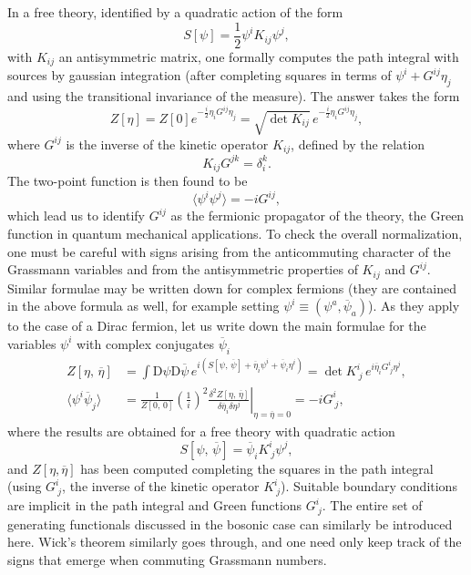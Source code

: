 In a free theory, identified by a quadratic action of the form
\[
    S[\psi] = \frac{1}{2} \psi^i K_{ij} \psi^j,
\]
with \(K_{ij}\) an antisymmetric matrix, one formally computes the path integral with sources by gaussian integration (after completing squares in terms of \(\psi^i + G^{ij} \eta_j \) and using the transitional invariance of the measure). The answer takes the form
\[
    Z[\eta] = Z[0] e^{-\frac{i}{2} \eta_i G^{ij} \eta_j} = \sqrt{\det K_{ij}} \, e^{-\frac{i}{2} \eta_i G^{ij} \eta_j},
\]
where \(G^{ij}\) is the inverse of the kinetic operator \(K_{ij}\), defined by the relation
\[
    K_{ij} G^{jk} = \delta_i^k.
\]
The two-point function is then found to be
\[
    \langle \psi^{i} \psi^{j} \rangle = -i G^{ij},
\]
which lead us to identify \(G^{ij}\) as the fermionic propagator of the theory, the Green function in quantum mechanical applications. To check the overall normalization, one must be careful with signs arising from the anticommuting character of the Grassmann variables and from the antisymmetric properties of \(K_{ij}\) and \(G^{ij}\). Similar formulae may be written down for complex fermions (they are contained in the above formula as well, for example setting \(\psi^i \equiv (\psi^a, \overline{\psi}_a)\)). As they apply to the case of a Dirac fermion, let us write down the main formulae for the variables \(\psi^i\) with complex conjugates \(\overline{\psi}_i\)
\[
    \begin{aligned}
        Z[\eta,\,\overline{\eta}]                  & = \int \mathrm{D} \psi \mathrm{D} \overline{\psi} \, e^{i \left( S[\psi,\,\overline{\psi}] + \overline{\eta}_i \psi^i + \overline{\psi}_i \eta^i \right)} = \det K^i_{\ j} \, e^{i \overline{\eta}_i G^{i}_{\ j} \eta^j}, \\
        \langle \psi^{i} \overline{\psi}_j \rangle & = \frac{1}{Z[0,\,0]} \left. \left(\frac{1}{i}\right)^2\frac{\delta^2 Z[\eta,\,\overline{\eta}]}{\delta \overline{\eta}_i \delta \eta^j} \right|_{\eta=\overline{\eta}=0} = -i G^{i}_{\ j},
    \end{aligned}
\]
where the results are obtained for a free theory with quadratic action
\[
    S[\psi,\,\overline{\psi}] = \overline{\psi}_i K^i_{\ j} \psi^j,
\]
and \(Z[\eta, \overline{\eta}]\) has been computed completing the squares in the path integral (using \(G^i_{\ j}\), the inverse of the kinetic operator \(K^i_{\ j}\)). Suitable boundary conditions are implicit in the path integral and Green functions \(G^i_{\ j}\). The entire set of generating functionals discussed in the bosonic case can similarly be introduced here. Wick's theorem similarly goes through, and one need only keep track of the signs that emerge when commuting Grassmann numbers.

